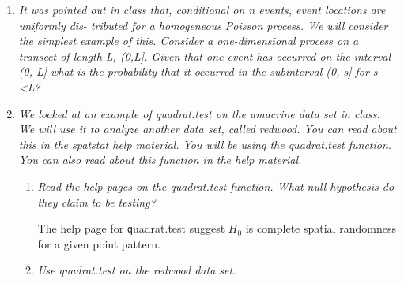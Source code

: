 \documentclass{article}\usepackage[]{graphicx}\usepackage[]{color}
\makeatletter
\newenvironment{kframe}{%
 \def\at@end@of@kframe{}%
 \ifinner\ifhmode%
  \def\at@end@of@kframe{\end{minipage}}%
  \begin{minipage}{\columnwidth}%
 \fi\fi%
 \def\FrameCommand##1{\hskip\@totalleftmargin \hskip-\fboxsep
 \colorbox{shadecolor}{##1}\hskip-\fboxsep
     \hskip-\linewidth \hskip-\@totalleftmargin \hskip\columnwidth}%
 \MakeFramed {\advance\hsize-\width
   \@totalleftmargin\z@ \linewidth\hsize
   \@setminipage}}%
 {\par\unskip\endMakeFramed%
 \at@end@of@kframe}
\newenvironment{knitrout}{}{} %
\makeatother
\begin{document}
\begin{enumerate}
\item {\it It was pointed out in class that, conditional on n events, event locations are uniformly dis- tributed for a homogeneous Poisson process. We will consider the simplest example of this. Consider a one-dimensional process on a transect of length L, (0,L]. Given that one event has occurred on the interval (0, L] what is the probability that it occurred in the subinterval (0, s] for s \textless L?}

\vspace{2in}

\item {\it We looked at an example of quadrat.test on the amacrine data set in class. We will use it to analyze another data set, called redwood. You can read about this in the spatstat help material. You will be using the quadrat.test function. You can also read about this function in the help material.}

\begin{enumerate}
\item {\it Read the help pages on the quadrat.test function. What null hypothesis do they claim to be testing?}

The help page for {\texttt quadrat.test} suggest $H_{0}$ is complete spatial randomness for a given point pattern.

\item {\it Use quadrat.test on the redwood data set.}

\begin{knitrout}\footnotesize
{}\color{fgcolor}\begin{kframe}


{\ttfamily\noindent{}}\end{kframe}


\end{knitrout}
\end{enumerate}
\end{enumerate}
\end{document}
